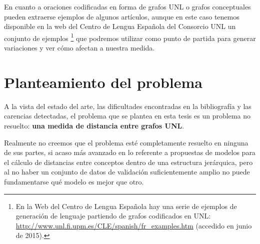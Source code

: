 \documentclass[a4paper,12pt,spanish]{book}
\begin{document}
En cuanto a oraciones codificadas en forma de grafos UNL o grafos conceptuales pueden
extraerse ejemplos de algunos artículos, aunque en este caso tenemos disponible en la
web del Centro de Lengua Española del Consorcio UNL un conjunto de ejemplos \footnote{
En la Web del Centro de Lengua Española hay una serie de ejemplos de generación
de lenguaje partiendo de grafos codificados en UNL:
\href{http://www.unl.fi.upm.es/CLE/spanish/fr\_examples.htm}{http://www.unl.fi.upm.es/CLE/spanish/fr\_examples.htm} (accedido en junio de 2015).
} que
podremos utilizar como punto de partida para generar variaciones y ver cómo afectan a
nuestra medida.


\section{Planteamiento del problema}
\label{2.problem/index:planteamiento-del-problema}\label{2.problem/index:planteamiento-problema}
A la vista del estado del arte, las dificultades encontradas en la bibliografía y las
carencias detectadas, el problema que se plantea en esta tesis es un problema no
resuelto: \textbf{una medida de distancia entre grafos UNL}.

Realmente no creemos que el problema esté completamente resuelto en ninguna de sus partes,
si acaso más avanzado en lo referente a propuestas de modelos para el cálculo de distancias
entre conceptos dentro de una estructura jerárquica, pero al no haber un conjunto de datos
de validación suficientemente amplio no puede fundamentarse qué modelo es mejor que otro.
\end{document}
